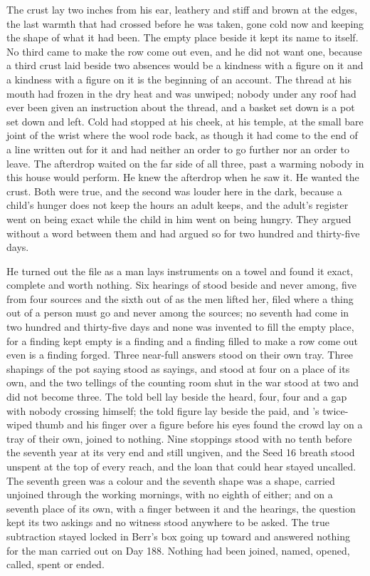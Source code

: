 The crust lay two inches from his ear, leathery and stiff and brown at the edges, the last warmth that had crossed  before he was taken, gone cold now and keeping the shape of what it had been. The empty place beside it kept its name to itself. No third came to make the row come out even, and he did not want one, because a third crust laid beside two absences would be a kindness with a figure on it and a kindness with a figure on it is the beginning of an account. The thread at his mouth had frozen in the dry heat and was unwiped; nobody under any roof had ever been given an instruction about the thread, and a basket set down is a pot set down and left. Cold had stopped at his cheek, at his temple, at the small bare joint of the wrist where the wool rode back, as though it had come to the end of a line written out for it and had neither an order to go further nor an order to leave. The afterdrop waited on the far side of all three, past a warming nobody in this house would perform. He knew the afterdrop when he saw it. He wanted the crust. Both were true, and the second was louder here in the dark, because a child's hunger does not keep the hours an adult keeps, and the adult's register went on being exact while the child in him went on being hungry. They argued without a word between them and had argued so for two hundred and thirty-five days.

He turned out the file as a man lays instruments on a towel and found it exact, complete and worth nothing. Six hearings of  stood beside and never among, five from four sources and the sixth out of  as the men lifted her, filed where a thing out of a person must go and never among the sources; no seventh had come in two hundred and thirty-five days and none was invented to fill the empty place, for a finding kept empty is a finding and a finding filled to make a row come out even is a finding forged. Three near-full answers stood on their own tray. Three shapings of the pot saying stood as sayings, and  stood at four on a place of its own, and the two tellings of the counting room shut in the war stood at two and did not become three. The told bell lay beside the heard, four, four and a gap with nobody crossing himself; the told figure lay beside the paid, and 's twice-wiped thumb and his finger over a figure before his eyes found the crowd lay on a tray of their own, joined to nothing. Nine stoppings stood with no tenth before the seventh year at its very end and still ungiven, and the Seed 16 breath stood unspent at the top of every reach, and the loan that could hear stayed uncalled. The seventh green was a colour and the seventh shape was a shape, carried unjoined through the working mornings, with no eighth of either; and on a seventh place of its own, with a finger between it and the hearings, the question kept its two askings and no witness stood anywhere to be asked. The true subtraction stayed locked in Berr's box going up  toward  and answered nothing for the man carried out on Day 188. Nothing had been joined, named, opened, called, spent or ended.

